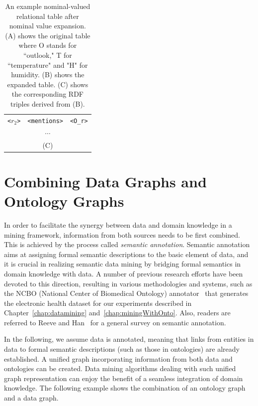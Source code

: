 \begin{table}[ht]
\begin{minipage}[b]{\linewidth}
\begin{tabular}{c c c}
\texttt{<$r_2$>}   &    \texttt{<mentions>}   &  \texttt{<O\_r>}\\
\multicolumn{3}{c}{$\cdots$}\\
\multicolumn{3}{c}{(C)}\\
\end{tabular}
\end{minipage}
\caption[Nominal value expansion for a relational table and the resulting RDF triples.]{\label{tbl:nominal-rel-expansion} An example nominal-valued relational table after nominal value expansion. (A) shows the original table where O stands for ``outlook," T for ``temperature" and "H" for humidity. (B) shows the expanded table. (C) shows the corresponding RDF triples derived from (B).}
\end{table}

\section{Combining Data Graphs and Ontology Graphs}

In order to facilitate the synergy between data and domain knowledge in a mining framework, information from both sources needs to be first combined. This is achieved by the process called \emph{semantic annotation}. Semantic annotation aims at assigning formal semantic descriptions to the basic element of data, and it is crucial in realizing semantic data mining by bridging formal semantics in domain knowledge with data. A number of previous research efforts have been devoted to this direction, resulting in various methodologies and systems, such as the NCBO (National Center of Biomedical Ontology) annotator~\cite{RI} that generates the electronic health dataset for our experiments described in Chapter~\ref{chap:datamining} and~\ref{chap:miningWithOnto}. Also, readers are referred to Reeve and Han~\cite{Reeve2005SurveyAnnotation} for a general survey on semantic annotation.

In the following, we assume data is annotated, meaning that links from entities in data to formal semantic descriptions (such as those in ontologies) are already established. A unified graph incorporating information from both data and ontologies can be created. Data mining algorithms dealing with such unified graph representation can enjoy the benefit of a seamless integration of domain knowledge. The following example shows the combination of an ontology graph and a data graph.



